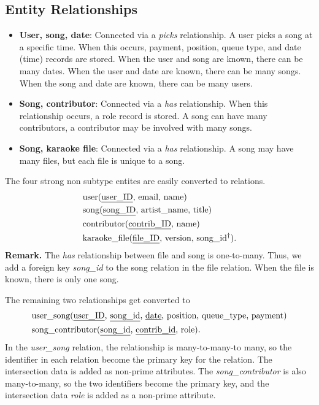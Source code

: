 \documentclass{report}
\begin{document}
    \subsection{Entity Relationships}
    \begin{itemize}
        \item \textbf{User, song, date}: Connected via a \textit{picks} relationship. A user picks a song at a specific time. When this occurs, payment, position, queue type, and date (time) records are stored. When the user and song are known, there can be many dates. When the user and date are known, there can be many songs. When the song and date are known, there can be many users.
        \item \textbf{Song, contributor}: Connected via a \textit{has} relationship. When this relationship occurs, a role record is stored. A song can have many contributors, a contributor may be involved with many songs.
        \item \textbf{Song, karaoke file}: Connected via a \textit{has} relationship. A song may have many files, but each file is unique to a song.
    \end{itemize}

    \pagebreak 
    \bigbreak \noindent 
    The four strong non subtype entites are easily converted to relations.
    \begin{align*}
        &\text{user(\underline{user\_ID}, email, name)} \\
        &\text{song(\underline{song\_ID}, artist\_name, title)} \\
        &\text{contributor(\underline{contrib\_ID}, name)} \\
        &\text{karaoke\_file(\underline{file\_ID}, version, song\_id$^{\dag}$)}
    .\end{align*}
    \bigbreak \noindent 
    \textbf{Remark.} The \textit{has} relationship between file and song is one-to-many. Thus, we add a foreign key \textit{song\_id} to the song relation in the file relation. When the file is known, there is only one song.

    \bigbreak \noindent 
    The remaining two relationships get converted to
    \begin{align*}
        &\text{user\_song(\underline{user\_ID}, \underline{song\_id}, \underline{date}, position, queue\_type, payment)} \\
        &\text{song\_contributor(\underline{song\_id}, \underline{contrib\_id}, role)}
    .\end{align*}
    \bigbreak \noindent 
    In the \textit{user\_song} relation, the relationship is many-to-many-to many, so the identifier in each relation become the primary key for the relation. The intersection data is added as non-prime attributes.
    \bigbreak \noindent 
    The \textit{song\_contributor} is also many-to-many, so the two identifiers become the primary key, and the intersection data \textit{role} is added as a non-prime attribute.
    \bigbreak \noindent 



    
\end{document}
